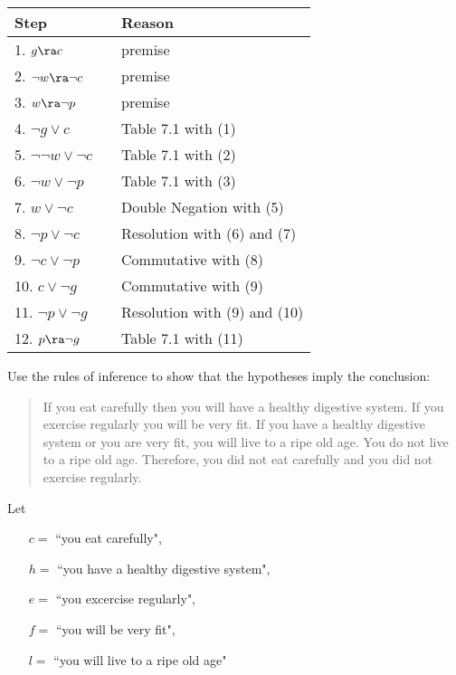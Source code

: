 \begin{questions}
\begin{solution}
    \begin{tabular}{lll}
        Step    & \hspace{0.2in} & Reason \\
        \hline
        1. $g \ra c$                    & & premise \\
        2. $\neg w \ra \neg c$          & & premise \\
        3. $w \ra \neg p$               & & premise \\
        4. $\neg g \vee c$              & & Table 7.1 with (1) \\
        5. $\neg \neg w \vee \neg c$    & & Table 7.1 with (2) \\
        6. $\neg w \vee \neg p$         & & Table 7.1 with (3) \\
        7. $w \vee \neg c$              & & Double Negation with (5) \\
        8. $\neg p \vee \neg c$         & & Resolution with (6) and (7) \\
        9. $\neg c \vee \neg p$         & & Commutative with (8) \\
        10. $c \vee \neg g$             & & Commutative with (9) \\
        11. $\neg p \vee \neg g$        & & Resolution with (9) and (10) \\
        12. $p \ra \neg g$              & & Table 7.1 with (11)
    \end{tabular}
\end{solution}


 Use the rules of inference to show that the hypotheses imply the conclusion:

\begin{quote}
If you eat carefully then you will have a healthy digestive system. If you exercise regularly you will be very fit. If you have a healthy digestive system or you are very fit, you will live to a ripe old age. You do not live to a ripe old age. Therefore, you did not eat carefully and you did not exercise regularly.
\end{quote}

Let
\begin{itemize}[itemsep=0pt,parsep=0pt,topsep=0pt,partopsep=0pt]
    \item[$c = $] ``you eat carefully",
    \item[$h = $] ``you have a healthy digestive system",
    \item[$e = $] ``you excercise regularly",
    \item[$f = $] ``you will be very fit", 
    \item[$l = $] ``you will live to a ripe old age"
\end{itemize}


\end{questions}

